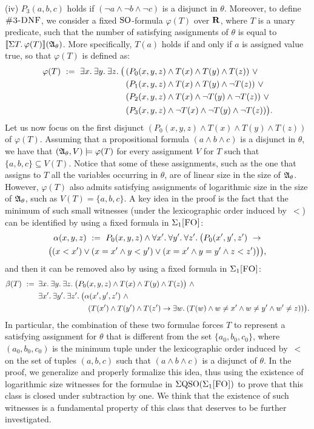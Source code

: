 (iv) $P_3(a,b,c)$ holds if $(\neg a \wedge \neg b \wedge \neg c)$ is a disjunct in $\theta$.
Moreover, to define $\ctdnf$, we consider a fixed ${\rm SO}$-formula $\varphi(T)$ over $\mathbf{R}$, where $T$ is a unary predicate, such that the number of satisfying assignments of $\theta$ is equal to ${\llbracket{}{\Sigma{T}.\,\varphi(T)}\rrbracket}(\mathfrak{A}_\theta)$. More specifically, $T(a)$ holds if and only if  $a$ is assigned value true, so that $\varphi(T)$ is defined as:
\begin{align*}
\varphi(T) \ := \ \exists{x}.\:\exists{y}.\:\exists{z}.\:\big(\,
&(P_0(x,y,z)\wedge T(x)\wedge  T(y)\wedge T(z))\ \vee\\
&(P_1(x,y,z)\wedge T(x)\wedge  T(y)\wedge \neg T(z))\ \vee\\
&(P_2(x,y,z)\wedge T(x)\wedge \neg T(y)\wedge \neg T(z))\ \vee\\
&(P_3(x,y,z)\wedge \neg T(x)\wedge \neg T(y)\wedge \neg T(z))\big).
\end{align*}
Let us now focus on the first disjunct $(P_0(x,y,z)\wedge T(x)\wedge  T(y)\wedge T(z))$ of $\varphi(T)$. Assuming that a propositional formula $(a\wedge b \wedge c)$ is a disjunct in $\theta$, we have that $(\mathfrak{A}_\theta,V) \models \varphi(T)$ for every assignment $V$ for $T$ such that $\{a,b,c\} \subseteq V(T)$. 
Notice that some of these assignments, such as the one that assigns to $T$ all the variables occurring in $\theta$, are of linear size in the size of $\mathfrak{A}_\theta$. However, $\varphi(T)$ also admits satisfying assignments of logarithmic size in the size of $\mathfrak{A}_\theta$, such as $V(T) = \{a,b,c\}$. A key idea in the proof is the fact that the minimum of such small witnesses (under the lexicographic order induced by~$<$) can be identified by using a fixed formula in $\Sigma_{1}\textsc{[FO]}$:
\begin{multline*}
\alpha(x,y,z) \ := \ P_0(x,y,z) \wedge  \forall{x'}.\:\forall{y'}.\:\forall{z'}.\: \big(P_0(x',y',z')\ \to\\
\big((x < x') \vee (x = x' \wedge y < y') \vee (x = x' \wedge y = y' \wedge z < z')\big)\big),
\end{multline*}
and then it can be removed also by using a fixed formula in $\Sigma_{1}\textsc{[FO]}$:
\begin{align*}
\beta(T) \ := \ \, & \ex{x} \ex{y} \ex{z} \big(P_0(x,y,z)\wedge T(x)\wedge  T(y)\wedge T(z)\big)\ \wedge \\
& \ex{x'}\ex{y'}\ex{z'} \big(\alpha(x',y',z')\ \wedge \\
& \hspace{23mm} (T(x')\wedge T(y')\wedge T(z')\to \ex{w}(T(w) \wedge w \neq x' \wedge w\neq y' \wedge w'\neq z))\big).
\end{align*}
In particular, the combination of these two formulae forces $T$ to represent a satisfying assignment for $\theta$ that is different from the set $\{a_0,b_0,c_0\}$, where $(a_0,b_0,c_0)$ is the minimum tuple under the lexicographic order induced by~$<$ on the set of tuples $(a,b,c)$ such that $(a \wedge b \wedge c)$ is a disjunct of $\theta$. In the proof, we generalize and properly formalize this idea, thus using the existence of logarithmic size witnesses for the formulae in $\Sigma{\rm QSO}(\Sigma_{1}\textsc{[FO]})$ to prove that this class is closed under subtraction by one. We think that the existence of such witnesses is a fundamental property of this class that deserves to be further investigated. 

